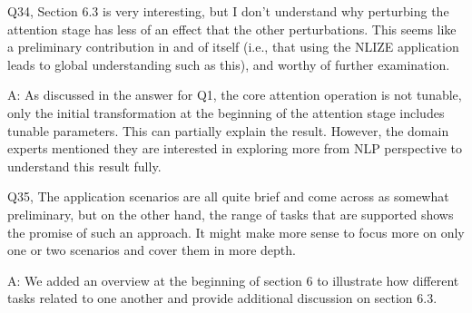 Q34, Section 6.3 is very interesting, but I don't understand why perturbing the attention stage has less of an effect that the other perturbations. This seems like a preliminary contribution in and of itself (i.e., that using the NLIZE application leads to global understanding such as this), and worthy of further examination.

A: As discussed in the answer for Q1, the core attention operation is not tunable, only the initial transformation at the beginning of the attention stage includes tunable parameters. This can partially explain the result. However, the domain experts mentioned they are interested in exploring more from NLP perspective to understand this result fully.

Q35, The application scenarios are all quite brief and come across as somewhat preliminary, but on the other hand, the range of tasks that are supported shows the promise of such an approach. It might make more sense to focus more on only one or two scenarios and cover them in more depth.

A: We added an overview at the beginning of section 6 to illustrate how different tasks related to one another and provide additional discussion on section 6.3.
